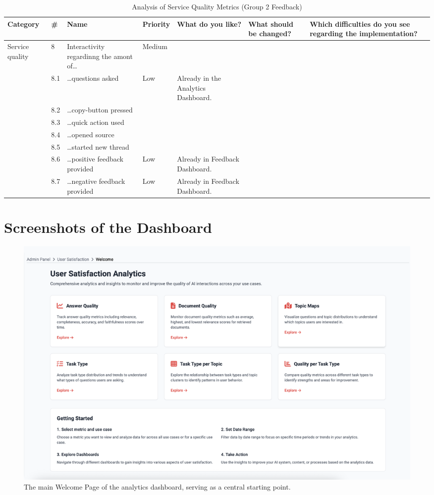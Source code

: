\documentclass[
	english,
	ruledheaders=section,%
	class=report,%
	thesis={type=bachelor},%
	accentcolor=1b,%
	custommargins=true,%
	marginpar=false,%
	parskip=half-,%
	fontsize=11pt,%
	DIV=14,
]{tudapub}
\begin{document}
\begin{table}
    \centering
    \small 
    \caption{Analysis of Service Quality Metrics (Group 2 Feedback)}
    \label{tab:service_quality_g2}
    \begin{tabularx}{\textheight}{p{2.2cm} l >{\RaggedRight\arraybackslash}X l >{\RaggedRight\arraybackslash}X >{\RaggedRight\arraybackslash}X >{\RaggedRight\arraybackslash}X}
        \toprule
        \textbf{Category} & \textbf{\#} & \textbf{Name} & \textbf{Priority} & \textbf{What do you like?} & \textbf{What should be changed?} & \textbf{Which difficulties do you see regarding the implementation?} \\
        \midrule

        \multirow{8}{=}{Service quality} 
        & 8 & Interactivity regardinng the amont of\dots & Medium & & & \\
        \cmidrule(l){2-7}
        & 8.1 & \dots questions asked & Low & Already in the Analytics Dashboard. & & \\
        \cmidrule(l){2-7}
        & 8.2 & \dots copy-button pressed & & & & \\
        \cmidrule(l){2-7}
        & 8.3 & \dots quick action used & & & & \\
        \cmidrule(l){2-7}
        & 8.4 & \dots opened source & & & & \\
        \cmidrule(l){2-7}
        & 8.5 & \dots started new thread & & & & \\
        \cmidrule(l){2-7}
        & 8.6 & \dots positive feedback provided & Low & Already in Feedback Dashboard. & & \\
        \cmidrule(l){2-7}
        & 8.7 & \dots negative feedback provided & Low & Already in Feedback Dashboard. & & \\
        \bottomrule
    \end{tabularx}
\end{table}

\clearpage %

\section{Screenshots of the Dashboard}

\begin{figure}[h!]
    \centering
    \includegraphics[width=0.75\linewidth]{images/WelcomePage.png}
    \caption{The main Welcome Page of the analytics dashboard, serving as a central starting point.}
    \label{fig:welcome_page}
\end{figure}
\end{document}

